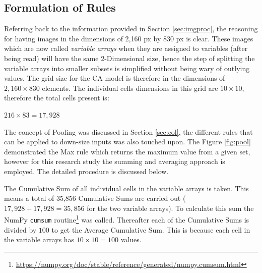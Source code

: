 \subsection{Formulation of Rules}
Referring back to the information provided in Section \ref{sec:imgproc}, the reasoning for having images in the dimensions of 2,160 px by 830 px is clear. These images which are now called \textit{variable arrays} when they are assigned to variables (after being read)  will have the same 2-Dimensional size, hence the step of splitting the variable arrays into smaller subsets is simplified without being wary of outlying values. The grid size for the CA model is therefore in the dimensions of $2,160 \times 830$ elements. The individual cells dimensions in this grid are $10 \times 10$, therefore the total cells present is:
\begin{center}
$216 \times 83 = 17,928$
\end{center}
The concept of Pooling was discussed in Section \ref{sec:col}, the different rules that can be applied to down-size inputs was also touched upon. The Figure \ref{fig:pool} demonstrated the Max rule which returns the maximum value from a given set, however for this research study the summing and averaging approach is employed. The detailed procedure is discussed below.

The Cumulative Sum of all individual cells in the variable arrays is taken. This means a total of 35,856 Cumulative Sums are carried out ($17,928 + 17,928 = 35,856$ for the two variable arrays). To calculate this sum the NumPy \texttt{cumsum} routine\footnote{\url{https://numpy.org/doc/stable/reference/generated/numpy.cumsum.html}} was called. Thereafter each of the Cumulative Sums is divided by $100$ to get the Average Cumulative Sum. This is because each cell in the variable arrays has $10 \times 10 = 100$ values.

